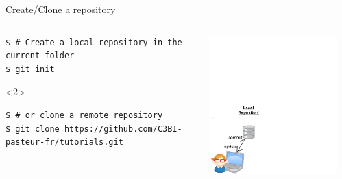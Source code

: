 \begin{frame}[fragile]{Create/Clone a repository}
	\begin{columns}
		\begin{column}{0.6\textwidth}
			\begin{lstlisting}
$ # Create a local repository in the current folder
$ git init
			\end{lstlisting}
\begin{onlyenv}<2>
			\begin{lstlisting}
$ # or clone a remote repository
$ git clone https://github.com/C3BI-pasteur-fr/tutorials.git
			\end{lstlisting}
\end{onlyenv}
		\end{column}
		\begin{column}{0.4\textwidth}
			\begin{center}
				 {
					\includegraphics[width=0.9\textwidth]{init.png}
				}\only<2> {
}
\end{center}
\end{column}
\end{columns}
\end{frame}
